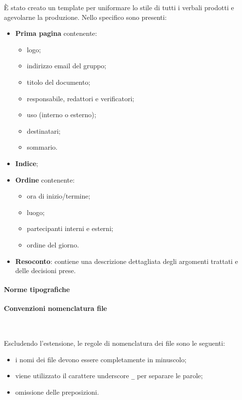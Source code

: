 \noindent È stato creato un template per uniformare lo stile di tutti i verbali prodotti e agevolarne la produzione.
Nello specifico sono presenti:
\begin{itemize}
    \item \textbf{Prima pagina} contenente:
          \begin {itemize}
    \item logo;
    \item indirizzo email del gruppo;
    \item titolo del documento;
    \item responsabile, redattori e verificatori;
    \item uso (interno o esterno);
    \item destinatari;
    \item sommario.
\end{itemize}
\item \textbf{Indice};
\item \textbf{Ordine} contenente:
\begin {itemize}
\item ora di inizio/termine;
\item luogo;
\item partecipanti interni e esterni;
\item ordine del giorno.
\end{itemize}
\item \textbf{Resoconto}: contiene una descrizione dettagliata degli argomenti trattati e delle decisioni prese.
\end{itemize}

\paragraph{Norme tipografiche}

\paragraph{Convenzioni nomenclatura file}~

\noindent Escludendo l'estensione, le regole di nomenclatura dei file sono le seguenti:
\begin{itemize}
    \item i nomi dei file devono essere completamente in minuscolo;
    \item viene utilizzato il carattere underscore \texttt{\_} per separare le parole;
    \item omissione delle preposizioni.
\end{itemize}

